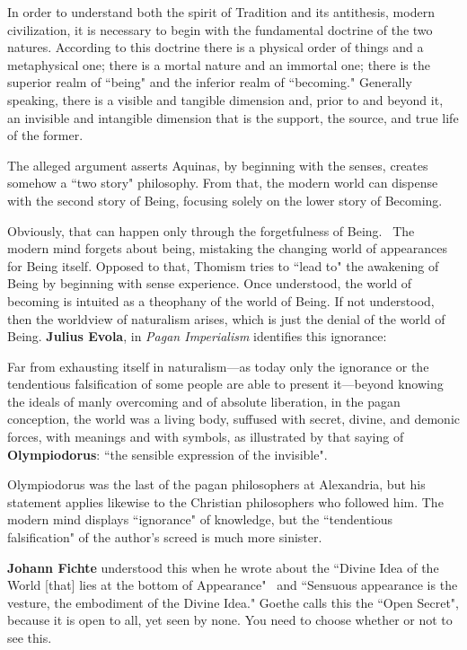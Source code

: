 \begin{quotex}
In order to understand both the spirit of Tradition and its antithesis, modern civilization, it is necessary to begin with the fundamental doctrine of the two natures. According to this doctrine there is a physical order of things and a metaphysical one; there is a mortal nature and an immortal one; there is the superior realm of ``being" and the inferior realm of ``becoming." Generally speaking, there is a visible and tangible dimension and, prior to and beyond it, an invisible and intangible dimension that is the support, the source, and true life of the former. 

\end{quotex}
The alleged argument asserts Aquinas, by beginning with the senses, creates somehow a ``two story" philosophy. From that, the modern world can dispense with the second story of Being, focusing solely on the lower story of Becoming.

Obviously, that can happen only through the forgetfulness of Being.  The modern mind forgets about being, mistaking the changing world of appearances for Being itself. Opposed to that, Thomism tries to ``lead to" the awakening of Being by beginning with sense experience. Once understood, the world of becoming is intuited as a theophany of the world of Being. If not understood, then the worldview of naturalism arises, which is just the denial of the world of Being. \textbf{Julius Evola}, in \emph{Pagan Imperialism} identifies this ignorance:

\begin{quotex}
Far from exhausting itself in naturalism—as today only the ignorance or the tendentious falsification of some people are able to present it—beyond knowing the ideals of manly overcoming and of absolute liberation, in the pagan conception, the world was a living body, suffused with secret, divine, and demonic forces, with meanings and with symbols, as illustrated by that saying of \textbf{Olympiodorus}: ``the sensible expression of the invisible". 

\end{quotex}
Olympiodorus was the last of the pagan philosophers at Alexandria, but his statement applies likewise to the Christian philosophers who followed him. The modern mind displays ``ignorance" of knowledge, but the ``tendentious falsification" of the author's screed is much more sinister.

\textbf{Johann Fichte} understood this when he wrote about the ``Divine Idea of the World [that] lies at the bottom of Appearance"  and ``Sensuous appearance is the vesture, the embodiment of the Divine Idea." Goethe calls this the ``Open Secret", because it is open to all, yet seen by none. You need to choose whether or not to see this.

